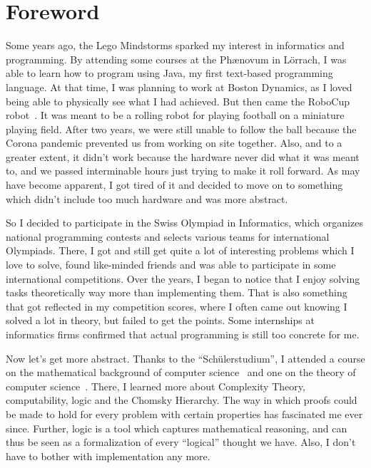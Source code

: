 \chapter*{Foreword}

Some years ago, the Lego Mindstorms sparked my interest in informatics and programming.
By attending some courses at the Phænovum in Lörrach, I was able to learn how to program using Java, my first text-based programming language.
At that time, I was planning to work at Boston Dynamics, as I loved being able to physically see what I had achieved.
But then came the RoboCup robot~\cite{roboCup}.
It was meant to be a rolling robot for playing football on a miniature playing field.
After two years, we were still unable to follow the ball because the Corona pandemic prevented us from working on site together.
Also, and to a greater extent, it didn't work because the hardware never did what it was meant to, and we passed interminable hours just trying to make it roll forward.
As may have become apparent, I got tired of it and decided to move on to something which didn't include too much hardware and was more abstract.

So I decided to participate in the Swiss Olympiad in Informatics, which organizes national programming contests and selects various teams for international Olympiads.
There, I got and still get quite a lot of interesting problems which I love to solve, found like-minded friends and was able to participate in some international competitions.
Over the years, I began to notice that I enjoy solving tasks theoretically way more than implementing them.
That is also something that got reflected in my competition scores, where I often came out knowing I solved a lot in theory, but failed to get the points.
Some internships at informatics firms confirmed that actual programming is still too concrete for me.

Now let's get more abstract.
Thanks to the ``Schülerstudium'', I attended a course on the mathematical background of computer science~\cite{discrete-maths} and one on the theory of computer science~\cite{theory-cs}.
There, I learned more about Complexity Theory, computability, logic and the Chomsky Hierarchy.
The way in which proofs could be made to hold for every problem with certain properties has fascinated me ever since.
Further, logic is a tool which captures mathematical reasoning, and can thus be seen as a formalization of every ``logical'' thought we have.
Also, I don't have to bother with implementation any more.

